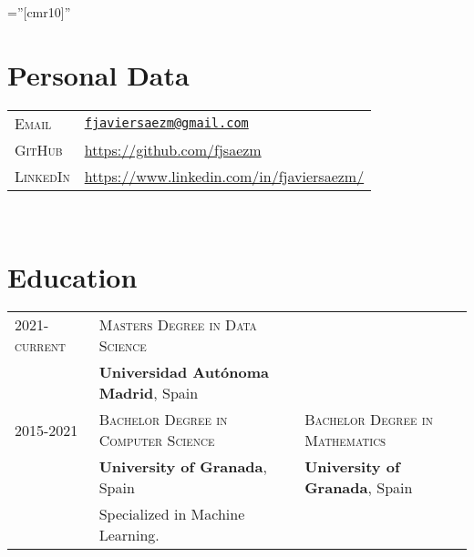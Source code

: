 \documentclass[a4paper,11pt]{article} %
\begin{document}
\pagestyle{empty} %

\font\fb=''[cmr10]'' %


\par{\bigskip\par} %

\section{Personal Data}

\begin{tabular}{ll}
  \textsc{Email} & \href{mailto:fjaviersaem@gmail.com}{\texttt{fjaviersaezm@gmail.com}} \\
   \textsc{GitHub} &  {\setmainfont[SmallCapsFont = Fontin SmallCaps]{Fontin-Regular}\href{https://github.com/fjsaezm}{https://github.com/fjsaezm}}\\ 
  \textsc{LinkedIn} & {\setmainfont[SmallCapsFont = Fontin SmallCaps]{Fontin-Regular}\href{https://www.linkedin.com/in/fjaviersaezm/}{https://www.linkedin.com/in/fjaviersaezm/}}
\end{tabular}\\



\section{Education}

\begin{tabular}{lp{7cm}l}

  \textsc{2021-current}
  & \textsc{Masters Degree in Data Science} \\
  & \footnotesize \textbf{Universidad Autónoma Madrid}, Spain \\
  \textsc{2015-2021}
  & \textsc{Bachelor Degree in Computer Science}   & \textsc{Bachelor Degree in Mathematics}\\
  & \footnotesize \textbf{University of Granada}, Spain     & \footnotesize \textbf{University of Granada}, Spain\\\
  & \footnotesize Specialized in Machine Learning. &  \\
\end{tabular}\\
\end{document}
